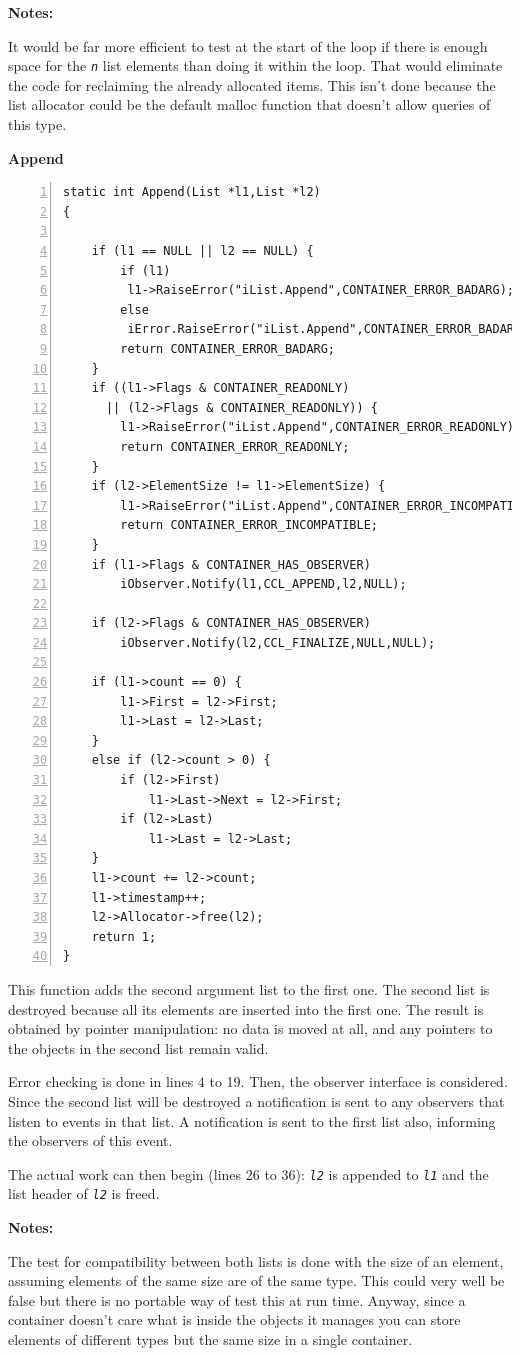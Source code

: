 \documentclass[12pt,a4paper]{memoir} %
\newif\iftth
\newcommand{\container}{}
\newcommand{\function}[1] {%
\vspace{0.2in}
\par\noindent
\textbf{#1}\index{#1!code for \container} \hrulefill
\iftth\else
\nopagebreak
\fi
\noindent\begin{Verbatim}[numbers=left, xleftmargin=7mm]}
\newcommand{\notes}{
\par \noindent \textbf{Notes:}\par\noindent}
\newcommand{\param}[1]{
\texttt{\textsl{#1}}
}
\begin{document}
{{\notes
It would be far more efficient to test at the start of the loop if there is enough space for the\param{n}list elements than
doing it within the loop. That would eliminate the code for reclaiming the already allocated items. This isn't done because
the list allocator could be the default malloc function that doesn't allow queries of this type.
 
\function{Append}
static int Append(List *l1,List *l2)
{

    if (l1 == NULL || l2 == NULL) {
        if (l1)
         l1->RaiseError("iList.Append",CONTAINER_ERROR_BADARG);
        else
         iError.RaiseError("iList.Append",CONTAINER_ERROR_BADARG);
        return CONTAINER_ERROR_BADARG;
    }
    if ((l1->Flags & CONTAINER_READONLY) 
      || (l2->Flags & CONTAINER_READONLY)) {
        l1->RaiseError("iList.Append",CONTAINER_ERROR_READONLY);
        return CONTAINER_ERROR_READONLY;
    }   
    if (l2->ElementSize != l1->ElementSize) {
        l1->RaiseError("iList.Append",CONTAINER_ERROR_INCOMPATIBLE);
        return CONTAINER_ERROR_INCOMPATIBLE;
    }           
    if (l1->Flags & CONTAINER_HAS_OBSERVER)
        iObserver.Notify(l1,CCL_APPEND,l2,NULL);
 
    if (l2->Flags & CONTAINER_HAS_OBSERVER)
        iObserver.Notify(l2,CCL_FINALIZE,NULL,NULL);
 
    if (l1->count == 0) {
        l1->First = l2->First; 
        l1->Last = l2->Last;
    }       
    else if (l2->count > 0) {
        if (l2->First)
            l1->Last->Next = l2->First;
        if (l2->Last)
            l1->Last = l2->Last;
    }       
    l1->count += l2->count;
    l1->timestamp++;
    l2->Allocator->free(l2);
    return 1;
}
\end{Verbatim}
This function  adds the second argument list to the first one. The second list is destroyed because all its elements are inserted into the first one. The result is obtained by pointer manipulation: no data is moved at all, and any pointers to the objects in the second list remain valid.

Error checking is done in lines 4 to 19. Then, the observer interface is considered. Since the second list will be destroyed
a notification is sent to any observers that listen to events in that list. A notification is sent to the first list also,
informing the observers of this event.

The actual work can then begin (lines 26 to 36):\param{l2}is appended to\param{l1}and the list header of\param{l2}is freed.
\notes
The test for compatibility between both lists is done with the size of an element,
assuming elements of the same size are of the same type. This could
very well be false but there is no portable way of test this at run time. Anyway, since a container doesn't care what is
inside the objects it manages you can store elements of different types but the same size in a single container.

}}
\end{document}
